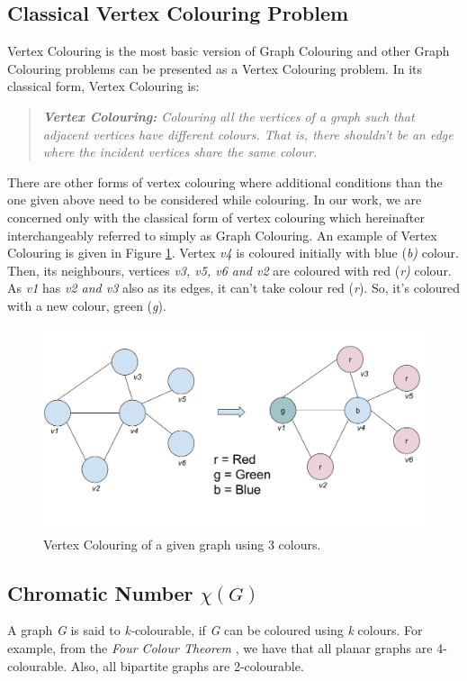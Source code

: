 \documentclass[MTech]{iitmdiss}
\begin{document}
\subsection{Classical Vertex Colouring Problem}
Vertex Colouring is the most basic version of Graph Colouring and other Graph Colouring problems can be presented as a Vertex Colouring problem. In its classical form, Vertex Colouring is:
\begin{verse}
\textit{\textbf{Vertex Colouring:} Colouring all the vertices of a graph such that adjacent vertices have different colours. That is, there shouldn't be an edge where the incident vertices share the same colour.}
\end{verse}
There are other forms of vertex colouring where additional conditions than the one given above need to be considered while colouring. In our work, we are concerned only with the classical form of vertex colouring which hereinafter interchangeably referred to simply as Graph Colouring. An example of Vertex Colouring is given in Figure \ref{fig:colouring}. Vertex \textit{v4} is coloured initially with blue (\textit{b)} colour. Then, its neighbours, vertices \textit{v3, v5, v6 and v2} are coloured with red (\textit{r)} colour. As \textit{v1} has \textit{v2 and v3} also as its edges, it can't take colour red (\textit{r}). So, it's coloured with a new colour, green (\textit{g}).

\begin{figure}[h]
    \centering
    \includegraphics[width=\textwidth,scale=1,keepaspectratio=true]{graphcolouring.jpg}
    \caption{
        Vertex Colouring of a given graph using 3 colours.
    }
    \label{fig:colouring}
\end{figure}

\subsection{Chromatic Number $ \chi(G) $}
A graph \textit{G} is said to \textit{k-}colourable, if \textit{G} can be coloured using \textit{k} colours. For example, from the \textit{Four Colour Theorem} \citep{appel1977, thomas98, wilson14}, we have that all planar graphs are 4-colourable. Also, all bipartite graphs are 2-colourable.
 
\end{document}
